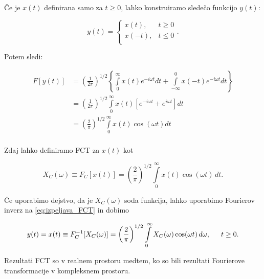 \documentclass[a4paper,12pt,openright]{book}
\begin{document}
Če je $x(t)$ definirana samo za $t \geq 0$, lahko konstruiramo sledečo funkcijo $y(t)$:

\begin{equation}
    y(t) =
    \begin{cases}
        x(t),  & t \geq 0\\
        x(-t), & t \leq 0\\
    \end{cases}.
\end{equation}

Potem sledi:

\begin{equation}
  \begin{aligned}
    F[y(t)] & = \left( \frac{1}{2 \pi} \right)^{1/2}
              \left\{ \int\limits_{0}^{\infty} x(t) e^{-i \omega t} dt +
                  \int\limits_{-\infty}^{0} x(-t) e^{-i \omega t} dt \right\}\\
            & = \left( \frac{1}{2 \pi} \right)^{1/2}
                \int\limits_{0}^{\infty} x(t) \left[ e^{-i \omega t} + 
                                                     e^{i \omega t}\right] dt\\
            & = \left( \frac{2}{\pi} \right)^{1/2}
                \int\limits_{0}^{\infty} x(t)  \cos(\omega t) dt\\
  \end{aligned}
\label{eq:izpeljava_FCT}
\end{equation}

Zdaj lahko definiramo FCT za $x(t)$ kot

\begin{equation}
X_C(\omega) \equiv F_C[x(t)]= \left( \frac{2}{\pi} \right)^{1/2} 
                          \int\limits_{0}^{\infty} x(t)  \cos(\omega t) \,dt.
\label{eq:FCT}
\end{equation}

Če uporabimo dejstvo, da je $X_C(\omega)$ soda funkcija, lahko uporabimo Fourierov inverz na \eqref{eq:izpeljava_FCT} in dobimo

\begin{equation}
y(t) = x(t) \equiv F_C^{-1}[X_C(\omega)]= \left( \frac{2}{\pi} \right)^{1/2} 
            \int\limits_{0}^{\infty} X_C(\omega)  \cos(\omega t) \,d\omega, \indent t \geq 0.
\label{eq:Inverzni_FCT}
\end{equation}

Rezultati FCT so v realnem prostoru medtem, ko so bili rezultati Fourierove transformacije v kompleksnem prostoru.
\end{document}
